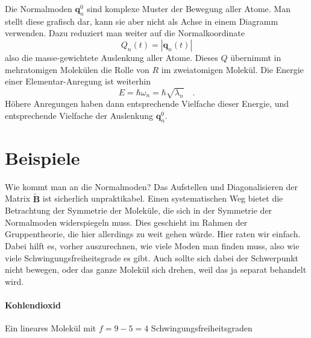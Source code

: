 Die Normalmoden $\mathbf{q}_n^0$ sind komplexe Muster der Bewegung aller Atome. Man stellt diese grafisch dar, kann sie aber nicht als Achse in einem Diagramm verwenden. Dazu reduziert man weiter auf die Normalkoordinate
\begin{equation}
Q_n(t) = | \mathbf{q}_n (t) |
\end{equation}
also die masse-gewichtete Auslenkung aller Atome. Dieses $Q$ übernimmt in mehratomigen Molekülen die Rolle von $R$ im zweiatomigen Molekül. Die Energie einer Elementar-Anregung ist weiterhin 
\begin{equation}
E = \hbar \omega_n = \hbar	\sqrt{\lambda_n} \quad .
\end{equation}
Höhere Anregungen haben dann entsprechende Vielfache dieser Energie, und entsprechende Vielfache der Auslenkung 
 $\mathbf{q}_n^0$.


\section{Beispiele}

Wie kommt man an die Normalmoden? Das Aufstellen und Diagonalisieren der Matrix  $\tilde{\mathbf{B}} $ ist sicherlich unpraktikabel. Einen systematischen Weg bietet die Betrachtung der Symmetrie der Moleküle, die sich in der Symmetrie der Normalmoden widerspiegeln muss. Dies geschieht im Rahmen der Gruppentheorie, die hier allerdings zu weit gehen würde. Hier raten wir einfach. Dabei hilft es, vorher auszurechnen, wie viele Moden man finden muss, also wie viele Schwingungsfreiheitsgrade es gibt. Auch sollte sich dabei der Schwerpunkt nicht bewegen, oder das ganze Molekül sich drehen, weil das ja separat behandelt wird.

\paragraph{Kohlendioxid} 
Ein lineares Molekül mit $f=9 - 5 = 4$ Schwingungsfreiheitsgraden


